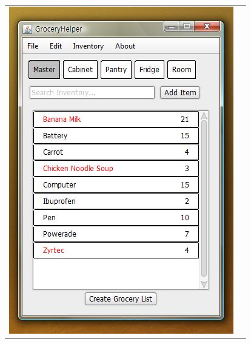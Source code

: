 \documentclass[letterpaper,12pt]{article}
\begin{document}
\begin{table}[H]
\centering
\begin{tabular}{c c}
\begin{minipage}{0.35\textwidth}
\includegraphics[width=\textwidth]{w01.png}
\end{minipage}

&


\end{tabular}
\end{table}
\end{document}
